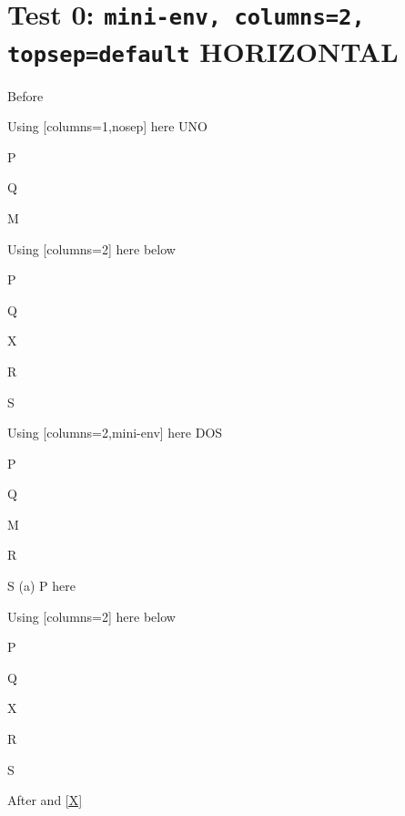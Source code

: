 \documentclass[10pt]{article}
\begin{document}
\section{Test 0: \texttt{mini-env, columns=2, topsep=default} HORIZONTAL}

Before
\begin{enumext}[columns=2,nosep]

\item Using [columns=1,nosep] here UNO
  \begin{enumext}[columns=1,nosep]%
     \item  P \item Q \item M %
  \end{enumext}

\item Using [columns=2] here below
\begin{enumext}[columns=2]%
     \item  P \item Q \item X  \item R \item S
  \end{enumext}

\columnbreak

\item Using [columns=2,mini-env] here DOS
  \begin{enumext}[columns=2,mini-env={0.4\linewidth},nosep,after={\footnotetext[3]{Some text}}]%
    \item  P \item Q \item M\label{X} \item R \item S\footnotemark[3]%
    \miniright
    (a) P here
  \end{enumext}

\item Using [columns=2] here below
\begin{enumext}[columns=2]%
     \item  P \item Q \item X  \item R \item S
  \end{enumext}

\end{enumext}
After  and \ref{X} \printpostnotes
\end{document}
